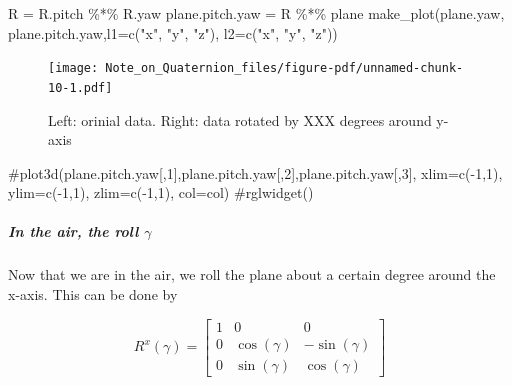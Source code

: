 \documentclass[
  letterpaper,
  DIV=11,
  numbers=noendperiod]{scrartcl}
\let\oldsubparagraph\subparagraph
\renewcommand{\subparagraph}[1]{\oldsubparagraph{#1}\mbox{}}
\newenvironment{Shaded}{\begin{snugshade}}{\end{snugshade}}
\newcommand{\AttributeTok}[1]{\textcolor[rgb]{0.40,0.45,0.13}{#1}}
\newcommand{\CommentTok}[1]{\textcolor[rgb]{0.37,0.37,0.37}{#1}}
\newcommand{\FunctionTok}[1]{\textcolor[rgb]{0.28,0.35,0.67}{#1}}
\newcommand{\NormalTok}[1]{\textcolor[rgb]{0.00,0.23,0.31}{#1}}
\newcommand{\OtherTok}[1]{\textcolor[rgb]{0.00,0.23,0.31}{#1}}
\newcommand{\SpecialCharTok}[1]{\textcolor[rgb]{0.37,0.37,0.37}{#1}}
\newcommand{\StringTok}[1]{\textcolor[rgb]{0.13,0.47,0.30}{#1}}
\begin{document}
\begin{Shaded}
\begin{Highlighting}[]
\NormalTok{R }\OtherTok{=}\NormalTok{ R.pitch }\SpecialCharTok{\%*\%}\NormalTok{ R.yaw}
\NormalTok{plane.pitch.yaw }\OtherTok{=}\NormalTok{ R }\SpecialCharTok{\%*\%}\NormalTok{ plane }
\FunctionTok{make\_plot}\NormalTok{(plane.yaw, plane.pitch.yaw,}\AttributeTok{l1=}\FunctionTok{c}\NormalTok{(}\StringTok{"x\textquotesingle{}"}\NormalTok{, }\StringTok{"y\textquotesingle{}"}\NormalTok{, }\StringTok{"z\textquotesingle{}\textquotesingle{}"}\NormalTok{), }\AttributeTok{l2=}\FunctionTok{c}\NormalTok{(}\StringTok{"x\textquotesingle{}\textquotesingle{}"}\NormalTok{, }\StringTok{"y\textquotesingle{}\textquotesingle{}"}\NormalTok{, }\StringTok{"z\textquotesingle{}\textquotesingle{}"}\NormalTok{)) }
\end{Highlighting}
\end{Shaded}

\begin{figure}[H]

{\centering \texttt{[image: Note\_on\_Quaternion\_files/figure-pdf/unnamed-chunk-10-1.pdf]}

}

\caption{Left: orinial data. Right: data rotated by XXX degrees around
y-axis}

\end{figure}

\begin{Shaded}
\begin{Highlighting}[]
\CommentTok{\#plot3d(plane.pitch.yaw[,1],plane.pitch.yaw[,2],plane.pitch.yaw[,3], xlim=c({-}1,1), ylim=c({-}1,1), zlim=c({-}1,1), col=col) }
\CommentTok{\#rglwidget()}
\end{Highlighting}
\end{Shaded}

\hypertarget{in-the-air-the-roll-gamma}{%
\subparagraph{\texorpdfstring{In the air, the roll
\(\gamma\)}{In the air, the roll \textbackslash gamma}}\label{in-the-air-the-roll-gamma}}

Now that we are in the air, we roll the plane about a certain degree
around the x-axis. This can be done by

\[
R^x(\gamma) = \begin{bmatrix}
1 & 0 & 0\\
0 & \cos(\gamma) & -\sin(\gamma) \\
 0 & \sin(\gamma) & \cos(\gamma) \end{bmatrix}
\]
\end{document}

